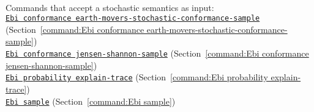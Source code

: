 {\begin{itemize}
\\Commands that accept a stochastic semantics as input: \\\null\qquad\hyperref[command:Ebi conformance earth-movers-stochastic-conformance-sample]{\texttt{Ebi conformance earth-movers-stochastic-conformance-sample}} (Section~\ref{command:Ebi conformance earth-movers-stochastic-conformance-sample})\\\null\qquad\hyperref[command:Ebi conformance jensen-shannon-sample]{\texttt{Ebi conformance jensen-shannon-sample}} (Section~\ref{command:Ebi conformance jensen-shannon-sample})\\\null\qquad\hyperref[command:Ebi probability explain-trace]{\texttt{Ebi probability explain-trace}} (Section~\ref{command:Ebi probability explain-trace})\\\null\qquad\hyperref[command:Ebi sample]{\texttt{Ebi sample}} (Section~\ref{command:Ebi sample})
\end{itemize}}
\def\ebiobjecttypelist{\begin{itemize}
\item alignments
\item stochastic language of alignments
\item stochastic deterministic finite automaton
\item deterministic finite automaton
\item directly follows model
\item stochastic directly follows model
\item event log
\item finite language
\item finite stochastic language
\item labelled Petri net
\item stochastic labelled Petri net
\item process tree
\item stochastic process tree
\item executions
\item directly follows graph
\item scalable vector graphics
\end{itemize}}
